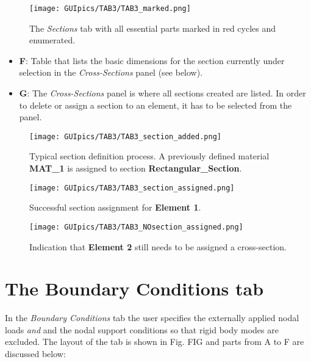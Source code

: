 \begin{appendices}
\begin{figure}
	\centering
	\texttt{[image: GUIpics/TAB3/TAB3\_marked.png]}
	\caption{The \textit{Sections} tab with all essential parts marked in red 
		cycles and enumerated.}
	\label{fig:TAB3_marked}
\end{figure}

\begin{itemize}
	\item \textbf{F}: Table that lists the basic dimensions for the section 
	currently under selection in the \textit{Cross-Sections} panel (see below).
	\item \textbf{G}: The \textit{Cross-Sections} panel is where all sections 
	created are listed. In order to delete or assign a section to an element, 
	it has to be selected from the panel. 
\end{itemize}
\clearpage
\begin{figure}[t]
	\centering
	\texttt{[image: GUIpics/TAB3/TAB3\_section\_added.png]}
	\caption{Typical section definition process. A previously defined material 
		\textbf{MAT\_1} is assigned to section \textbf{Rectangular\_Section}.}
	\label{fig:TAB3_section_added}
\end{figure}

\begin{figure}[b]
	\centering
	\texttt{[image: GUIpics/TAB3/TAB3\_section\_assigned.png]}
	\caption{Successful section assignment for \textbf{Element 1}.}
	\label{fig:TAB3_section_assigned}
\end{figure}
\clearpage
\begin{figure}
	\centering
	\texttt{[image: GUIpics/TAB3/TAB3\_NOsection\_assigned.png]}
	\caption{Indication that \textbf{Element 2} still needs to be assigned a 
		cross-section.}
	\label{fig:TAB3_NOsection_assigned}
\end{figure}

\section*{The Boundary Conditions tab}

In the \textit{Boundary Conditions} tab the user specifies the externally 
applied nodal loads \textit{and} and the nodal support conditions so that rigid 
body modes are excluded. The layout of the tab is shown in Fig. FIG and parts 
from A to F are discussed below:


\end{appendices}
